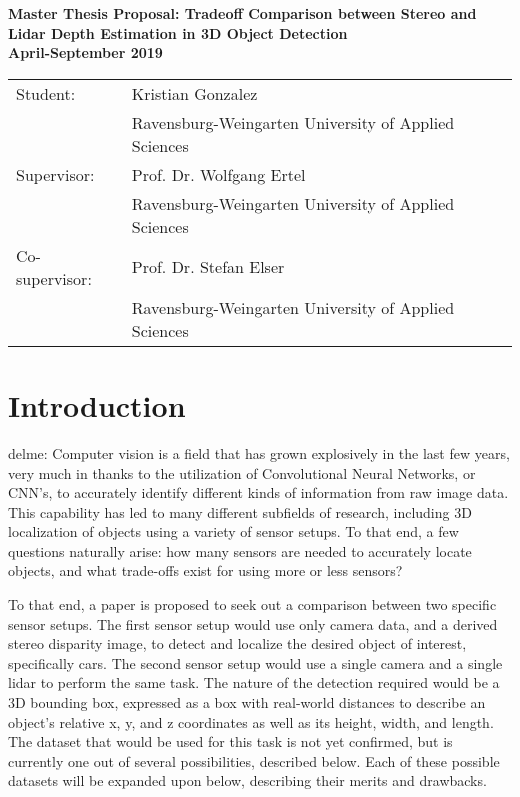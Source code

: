 \begin{center}
    \large
    \textbf{Master Thesis Proposal: Tradeoff Comparison between Stereo and Lidar Depth Estimation in 3D Object Detection}\\
    \noindent \textbf{April-September 2019}\\
    \normalsize 
\end{center}

\begin{tabular}{ll}
    Student: & Kristian Gonzalez \\
    & Ravensburg-Weingarten University of Applied Sciences\\
    Supervisor: & Prof. Dr. Wolfgang Ertel \\
    & Ravensburg-Weingarten University of Applied Sciences\\
    Co-supervisor: & Prof. Dr. Stefan Elser\\
    & Ravensburg-Weingarten University of Applied Sciences\\
\end{tabular}

\section{Introduction}
delme:
Computer vision is a field that has grown explosively in the last few years, very much in thanks to the utilization of Convolutional Neural Networks, or CNN's, to accurately identify different kinds of information from raw image data. This capability has led to many different subfields of research, including 3D localization of objects using a variety of sensor setups. To that end, a few questions naturally arise: how many sensors are needed to accurately locate objects, and what trade-offs exist for using more or less sensors?

To that end, a paper is proposed to seek out a comparison between two specific sensor setups. The first sensor setup would use only camera data, and a derived stereo disparity image, to detect and localize the desired object of interest, specifically cars. The second sensor setup would use a single camera and a single lidar to perform the same task. The nature of the detection required would be a 3D bounding box, expressed as a box with real-world distances to describe an object's relative x, y, and z coordinates as well as its height, width, and length. The dataset that would be used for this task is not yet confirmed, but is currently one out of several possibilities, described below. Each of these possible datasets will be expanded upon below, describing their merits and drawbacks.


